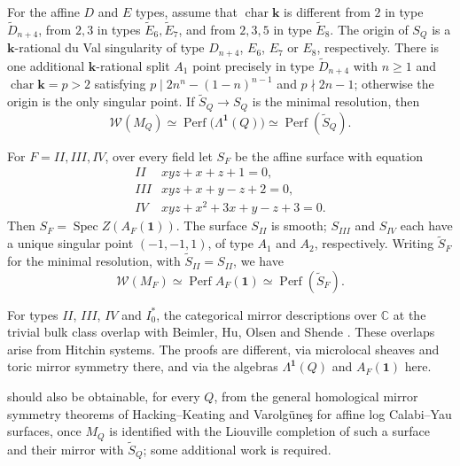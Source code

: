 \documentclass[a4paper]{amsart}
\newcommand{\kk}{\mathbf{k}}
\newcommand{\C}{\mathbb{C}}
\DeclareMathOperator{\Perf}{Perf}
\numberwithin{equation}{section}
\begin{document}
\begin{corollary}\label{cor:unipotent-mirror}
For the affine $D$ and $E$ types, assume that $\operatorname{char}\kk$ is different from $2$ in type
$\widetilde D_{n+4}$, from $2,3$ in types $\widetilde E_6,\widetilde E_7$,
and from $2,3,5$ in type $\widetilde E_8$. The origin of $S_Q$ is a
$\kk$-rational du Val singularity of type $D_{n+4}$, $E_6$, $E_7$
or $E_8$, respectively. There is one additional $\kk$-rational split
$A_1$ point precisely in type $\widetilde D_{n+4}$ with $n\ge1$ and
$\operatorname{char}\kk=p>2$ satisfying
$p\mid 2n^n-(1-n)^{n-1}$ and $p\nmid2n-1$; otherwise the origin is
the only singular point.
If $\widetilde S_Q\to S_Q$ is the minimal resolution, then
\[
 \mathcal W(M_Q)\simeq
 \Perf\bigl(\Lambda^{\boldsymbol1}(Q)\bigr)
 \simeq\Perf(\widetilde S_Q).
\]

For $F=II,III,IV$, over every field let $S_F$ be the affine surface
with equation
\[
\begin{array}{c|l}
 II&xyz+x+z+1=0,\\
 III&xyz+x+y-z+2=0,\\
 IV&xyz+x^2+3x+y-z+3=0.
\end{array}
\]
Then $S_F=\operatorname{Spec}Z(A_F(\boldsymbol1))$.
The surface $S_{II}$ is smooth; $S_{III}$ and $S_{IV}$ each have a unique
singular point $(-1,-1,1)$, of type $A_1$ and $A_2$, respectively.
Writing $\widetilde S_F$ for the minimal resolution, with
$\widetilde S_{II}=S_{II}$, we have
\[
 \mathcal W(M_F)\simeq\Perf A_F(\boldsymbol1)
 \simeq\Perf(\widetilde S_F).
\]
\end{corollary}

\begin{remark}\label{rem:painleve}
For types $II$, $III$, $IV$ and $I_0^*$, the categorical mirror
descriptions over $\C$ at the trivial bulk class overlap with
Beimler, Hu, Olsen and Shende \cite[Theorem~1.1]{BHOS}.
These overlaps arise from Hitchin systems. The proofs are
different, via microlocal sheaves and
toric mirror symmetry there, and via the algebras
$\Lambda^{\boldsymbol1}(Q)$ and $A_F(\boldsymbol1)$ here.

 should also be obtainable, for every $Q$,
from the general homological mirror symmetry theorems of
Hacking--Keating \cite{HK} and Varolg\"une\c{s} \cite{Var} for affine
log Calabi--Yau surfaces, once $M_Q$ is identified with the Liouville
completion of such a surface and their mirror with $\widetilde S_Q$;
some additional work is required.
\end{remark}
\end{document}
